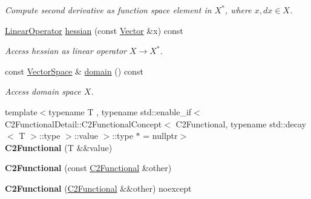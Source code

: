 \begin{DoxyCompactItemize}
\begin{DoxyCompactList}\small\item\em Compute second derivative as function space element in $X^*$, where $x,dx\in X$. \end{DoxyCompactList}\item 
\hyperlink{classSpacy_1_1LinearOperator}{Linear\+Operator} \hyperlink{classSpacy_1_1C2Functional_a97eeeb376ed178ea7e2f109967f99c24}{hessian} (const \hyperlink{classSpacy_1_1Vector}{Vector} \&x) const \hypertarget{classSpacy_1_1C2Functional_a97eeeb376ed178ea7e2f109967f99c24}{}\label{classSpacy_1_1C2Functional_a97eeeb376ed178ea7e2f109967f99c24}

\begin{DoxyCompactList}\small\item\em Access hessian as linear operator $ X \rightarrow X^* $. \end{DoxyCompactList}\item 
const \hyperlink{classSpacy_1_1VectorSpace}{Vector\+Space} \& \hyperlink{classSpacy_1_1C2Functional_ac75246c876b8bf75cdd4f1264bdb49ae}{domain} () const \hypertarget{classSpacy_1_1C2Functional_ac75246c876b8bf75cdd4f1264bdb49ae}{}\label{classSpacy_1_1C2Functional_ac75246c876b8bf75cdd4f1264bdb49ae}

\begin{DoxyCompactList}\small\item\em Access domain space $X$. \end{DoxyCompactList}\item 
{\footnotesize template$<$typename T , typename std\+::enable\+\_\+if$<$ C2\+Functional\+Detail\+::\+C2\+Functional\+Concept$<$ C2\+Functional, typename std\+::decay$<$ T $>$\+::type $>$\+::value $>$\+::type $\ast$  = nullptr$>$ }\\{\bfseries C2\+Functional} (T \&\&value)\hypertarget{classSpacy_1_1C2Functional_ab6c458ef1a423c05f4996717f3772206}{}\label{classSpacy_1_1C2Functional_ab6c458ef1a423c05f4996717f3772206}

\item 
{\bfseries C2\+Functional} (const \hyperlink{classSpacy_1_1C2Functional}{C2\+Functional} \&other)\hypertarget{classSpacy_1_1C2Functional_afe2ea31d1e077b381663fd9533c62f5f}{}\label{classSpacy_1_1C2Functional_afe2ea31d1e077b381663fd9533c62f5f}

\item 
{\bfseries C2\+Functional} (\hyperlink{classSpacy_1_1C2Functional}{C2\+Functional} \&\&other) noexcept\hypertarget{classSpacy_1_1C2Functional_ae08eec2c178bd9f9283566f48763d30f}{}\label{classSpacy_1_1C2Functional_ae08eec2c178bd9f9283566f48763d30f}


\end{DoxyCompactItemize}
